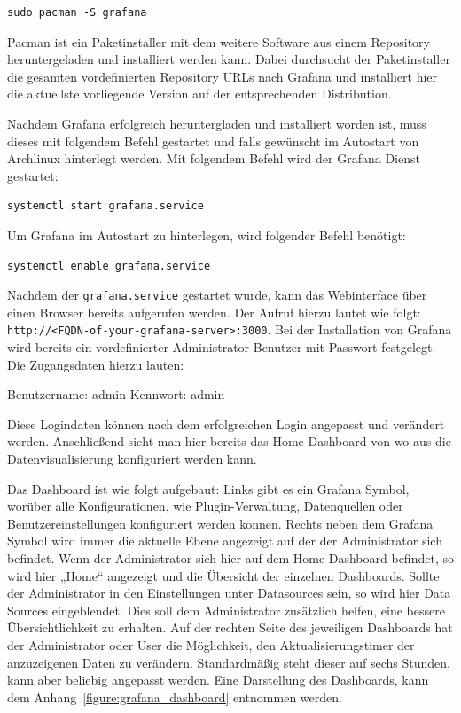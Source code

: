 {\begin{verbatim}
sudo pacman -S grafana
\end{verbatim}

Pacman ist ein Paketinstaller mit dem weitere Software aus einem Repository
heruntergeladen und installiert werden kann. Dabei durchsucht der
Paketinstaller die gesamten vordefinierten Repository URLs nach Grafana und
installiert hier die aktuellste vorliegende Version auf der entsprechenden
Distribution.

Nachdem Grafana erfolgreich heruntergladen und installiert worden ist, muss
dieses mit folgendem Befehl gestartet und falls gewünscht im Autostart von
Archlinux hinterlegt werden. Mit folgendem Befehl wird der Grafana Dienst
gestartet:
\begin{verbatim}
systemctl start grafana.service
\end{verbatim}

Um Grafana im Autostart zu hinterlegen, wird folgender Befehl benötigt:
\begin{verbatim}
systemctl enable grafana.service
\end{verbatim}

Nachdem der \texttt{grafana.service} gestartet wurde, kann das Webinterface
über einen Browser bereits aufgerufen werden. Der Aufruf hierzu lautet wie
folgt: \texttt{http://<FQDN-of-your-grafana-server>:3000}. Bei der Installation
von Grafana wird bereits ein vordefinierter Administrator Benutzer mit Passwort
festgelegt. Die Zugangsdaten hierzu lauten:

\begin{outline}
  \1 Benutzername: admin
  \1 Kennwort: admin
\end{outline}

Diese Logindaten können nach dem erfolgreichen Login angepasst und verändert
werden. Anschließend sieht man hier bereits das Home Dashboard von wo aus die
Datenvisualisierung konfiguriert werden kann.

Das Dashboard ist wie folgt aufgebaut: Links gibt es ein Grafana Symbol,
worüber alle Konfigurationen, wie Plugin\hyp{}Verwaltung, Datenquellen oder
Benutzereinstellungen konfiguriert werden können. Rechts neben dem Grafana
Symbol wird immer die aktuelle Ebene angezeigt auf der der Administrator sich
befindet. Wenn der Administrator sich hier auf dem Home Dashboard befindet, so
wird hier „Home“ angezeigt und die Übersicht der einzelnen Dashboards. Sollte
der Administrator in den Einstellungen unter Datasources sein, so wird hier
Data Sources eingeblendet. Dies soll dem Administrator zusätzlich helfen, eine
bessere Übersichtlichkeit zu erhalten. Auf der rechten Seite des jeweiligen
Dashboards hat der Administrator oder User die Möglichkeit, den
Aktualisierungstimer der anzuzeigenen Daten zu verändern. Standardmäßig steht
dieser auf sechs Stunden, kann aber beliebig angepasst werden. Eine Darstellung
des Dashboards, kann dem Anhang~\ref{figure:grafana_dashboard} entnommen
werden.


}
